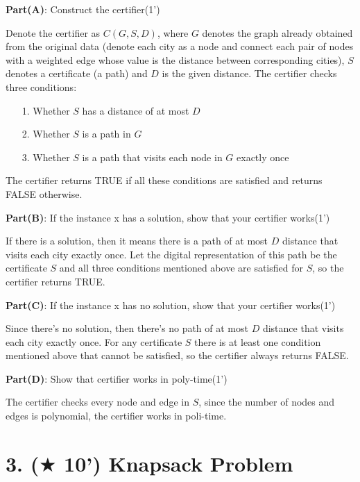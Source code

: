 \documentclass{article}
\begin{document}
\begin{enumerate}[(a)]
	\textbf{Part(A)}: Construct the certifier(1')
	{\color{blue}
	\par Denote the certifier as $C(G,S,D)$, where $G$ denotes the graph already obtained from the original data (denote each city as a node and connect each pair of nodes with a weighted edge whose value is the distance between corresponding cities), $S$ denotes a certificate (a path) and $D$ is the given distance. The certifier checks three conditions:
	\begin{enumerate}
		\item[1.] Whether $S$ has a distance of at most $D$
		\item[2.] Whether $S$ is a path in $G$
		\item[3.] Whether $S$ is a path that visits each node in $G$ exactly once
	\end{enumerate}
	\par The certifier returns TRUE if all these conditions are satisfied and returns FALSE otherwise.
	}
	\par\textbf{Part(B)}: If the instance x has a solution, show that your certifier works(1')
	{\color{blue}
	\par If there is a solution, then it means there is a path of at most $D$ distance that visits each city exactly once. Let the digital representation of this path be the certificate $S$ and all three conditions mentioned above are satisfied for $S$, so the certifier returns TRUE.
	}
	\par\textbf{Part(C)}: If the instance x has no solution, show that your certifier works(1')
	{\color{blue}
	\par Since there's no solution, then there's no path of at most $D$ distance that visits each city exactly once. For any certificate $S$ there is at least one condition mentioned above that cannot be satisfied, so the certifier always returns FALSE.
	}
	\par\textbf{Part(D)}: Show that certifier works in poly-time(1')
	{\color{blue}
	\par The certifier checks every node and edge in $S$, since the number of nodes and edges is polynomial, the certifier works in poli-time.
	}
\end{enumerate}

\newpage
\section*{3. ($\bigstar$ 10') Knapsack Problem}
\end{document}
